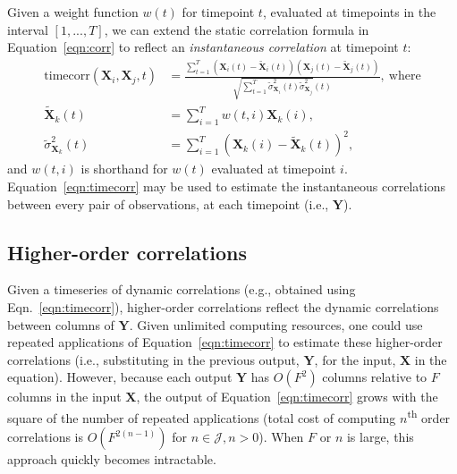 \documentclass[english]{article}
\begin{document}
Given a weight function $w(t)$ for timepoint $t$, evaluated at
timepoints in the interval $\left[ 1, ..., T \right]$, we can extend the static correlation formula
in Equation~\ref{eqn:corr} to reflect an \textit{instantaneous
  correlation} at timepoint $t$:
\begin{align}
  \mathrm{timecorr}(\mathbf{X}_i, \mathbf{X}_j, t) &= \frac{\sum_{t=1}^T \left(\mathbf{X}_i(t)
                                              -
                                              \widetilde{\mathbf{X}}_i(t)\right) \left(\mathbf{X}_j(t)
                                              -
                                              \widetilde{\mathbf{X}}_j(t)\right)}{\sqrt{\sum_{t=1}^T
                                              \widetilde{\sigma}^2_{\mathbf{X}_i}(t) 
                                              \widetilde{\sigma}^2_{\mathbf{X}_j}}(t)},~\mathrm{where}\\\label{eqn:timecorr}
  \widetilde{\mathbf{X}}_k(t) &= \sum_{i=1}^T
                       w(t, i)\mathbf{X}_k(i),\\
  \widetilde{\sigma}^2_{\mathbf{X}_k}(t) &= \sum_{i=1}^T \left( \mathbf{X}_k(i) -
                            \widetilde{\mathbf{X}}_k(t) \right)^2,
\end{align}
and $w(t, i)$ is shorthand for $w(t)$ evaluated at timepoint $i$.
Equation~\ref{eqn:timecorr} may be used to estimate the instantaneous
correlations between every pair of observations, at each timepoint
(i.e., $\mathbf{Y}$).

\subsection*{Higher-order correlations}
Given a timeseries of dynamic correlations (e.g., obtained using
Eqn.~\ref{eqn:timecorr}), higher-order correlations reflect the
dynamic correlations between columns of $\mathbf{Y}$.  Given unlimited
computing resources, one could use repeated applications of
Equation~\ref{eqn:timecorr} to estimate these higher-order
correlations (i.e., substituting in the previous output, $\mathbf{Y}$,
for the input, $\mathbf{X}$ in the equation).  However, because each
output $\mathbf{Y}$ has $O(F^2)$ columns relative to $F$ columns in
the input $\mathbf{X}$, the output of Equation~\ref{eqn:timecorr}
grows with the square of the number of repeated applications (total
cost of computing $n$\textsuperscript{th} order correlations is
$O(F^{2(n - 1)})$ for $n \in \mathcal{J}, n > 0$).  When $F$ or $n$ is large,
this approach quickly becomes intractable.
\end{document}
